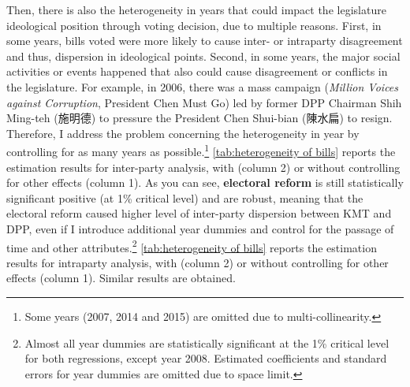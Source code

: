 Then, there is also the heterogeneity in years that could impact the legislature ideological position through voting decision, due to multiple reasons. First, in some years, bills voted were more likely to cause inter- or intraparty disagreement and thus, dispersion in ideological points. Second, in some years, the major social activities or events happened that also could cause disagreement or conflicts in the legislature. For example, in 2006, there was a mass campaign (\textit{Million Voices against Corruption}, President Chen Must Go) led by former DPP Chairman Shih Ming-teh (施明德) to pressure the President Chen Shui-bian (陳水扁) to resign. Therefore, I address the problem concerning the heterogeneity in year by controlling for as many years as possible.\footnote{Some years (2007, 2014 and 2015) are omitted due to multi-collinearity.}  \autoref{tab:heterogeneity of bills} reports the estimation results for inter-party analysis, with (column 2) or without controlling for other effects (column 1). As you can see, \textbf{electoral reform }is still statistically significant positive (at 1\% critical level) and are robust, meaning that the electoral reform caused higher level of inter-party dispersion between KMT and DPP, even if I introduce additional year dummies and control for the passage of time and other attributes.\footnote{Almost all year dummies are statistically significant at the 1\% critical level for both regressions, except year 2008. Estimated coefficients and standard errors for year dummies are omitted due to space limit.}  \autoref{tab:heterogeneity of bills} reports the estimation results for intraparty analysis, with (column 2) or without controlling for other effects (column 1). Similar results are obtained.





